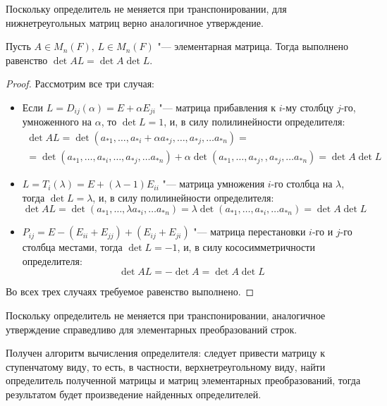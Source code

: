 \begin{note}
	Поскольку определитель не меняется при транспонировании, для нижнетреугольных матриц верно аналогичное утверждение.
\end{note}

\begin{proposition}
	Пусть $A \in M_n(F)$, $L \in M_n(F)$ "--- элементарная матрица. Тогда выполнено равенство $\det{AL} = \det{A}\det{L}$.
\end{proposition}

\begin{proof}
	Рассмотрим все три случая:
	\begin{itemize}
		\item Если $L = D_{ij}(\alpha) = E + \alpha E_{ji}$ "--- матрица прибавления к $i$-му столбцу $j$-го, умноженного на $\alpha$, то $\det{L} = 1$, и, в силу полилинейности определителя:
		\begin{multline*}
			\det{AL} = \det{(a_{*1}, \dots,a_{*i} + \alpha a_{*j},\dots, a_{*j}, \dotsc a_{*n})} =\\
			=\det{(a_{*1},\dots,a_{*i},\dots, a_{*j}, \dotsc a_{*n})} + \alpha\det{(a_{*1},\dots,a_{*j},, a_{*j}, \dotsc a_{*n})} = \det{A}\det{L}
		\end{multline*}
		
		\item $L = T_{i}(\lambda) = E + (\lambda - 1) E_{ii}$ "--- матрица умножения $i$-го столбца на $\lambda$, тогда $\det{L} = \lambda$, и, в силу полилинейности определителя:
		\[\det{AL} = \det{(a_{*1}, \dots,\lambda a_{*i},\dots a_{*n})} =\lambda\det{(a_{*1},\dots,a_{*i},\dots a_{*n})} = \det{A}\det{L}\]
		
		\item $P_{ij} = E - (E_{ii} + E_{jj}) + (E_{ij} + E_{ji})$ "--- матрица перестановки $i$-го и $j$-го столбца местами, тогда $\det{L} = -1$, и, в силу кососимметричности определителя:
		\[\det{AL} = -\det{A} = \det{A}\det{L}\]
	\end{itemize}

	Во всех трех случаях требуемое равенство выполнено.
\end{proof}

\begin{note}
	Поскольку определитель не меняется при транспонировании, аналогичное утверждение справедливо для элементарных преобразований строк.
\end{note}

\begin{corollary}
	Получен алгоритм вычисления определителя: следует привести матрицу к ступенчатому виду, то есть, в частности, верхнетреугольному виду, найти определитель полученной матрицы и матриц элементарных преобразований, тогда результатом будет произведение найденных определителей.
\end{corollary}

